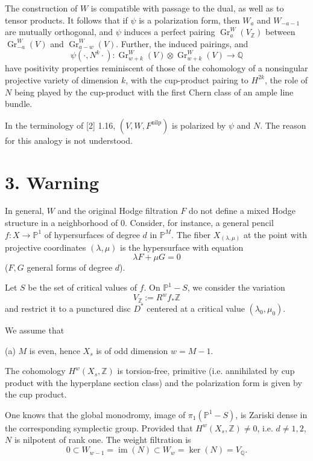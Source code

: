 \documentclass[11pt,a4paper]{article}
\theoremstyle{plain}
\theoremstyle{definition}
\DeclareMathOperator{\Gr}{Gr}
\DeclareMathOperator{\im}{im}
\begin{document}
The construction of $W$ is compatible with passage to the dual, as well as to tensor products. It follows that if $\psi$ is a polarization form, then $W_{a}$ and $W_{-a-1}$ are mutually orthogonal, and $\psi$ induces a perfect pairing $\Gr_{a}^{W}(V_{\mathbb{Z}})$ between $\Gr_{-a}^{W}(V)$ and $\Gr_{a-w}^{W}(V)$. Further, the induced pairings, and
\[
\psi(\cdot, N^{k}\cdot): \Gr_{w+k}^{W}(V) \otimes \Gr_{w+k}^{W}(V) \to \mathbb{Q}
\]
have positivity properties reminiscent of those of the cohomology of a nonsingular projective variety of dimension $k$, with the cup-product pairing to $H^{2k}$, the role of $N$ being played by the cup-product with the first Chern class of an ample line bundle.

In the terminology of [2] 1.16, $(V, W, F^{\text{nilp}})$ is polarized by $\psi$ and $N$. The reason for this analogy is not understood.

\section{3. Warning}

In general, $W$ and the original Hodge filtration $F$ do not define a mixed Hodge structure in a neighborhood of 0. Consider, for instance, a general pencil $f: X \to \mathbb{P}^{1}$ of hypersurfaces of degree $d$ in $\mathbb{P}^{M}$. The fiber $X_{(\lambda,\mu)}$ at the point with projective coordinates $(\lambda,\mu)$ is the hypersurface with equation
\[
\lambda F + \mu G = 0
\]
($F, G$ general forms of degree $d$).

Let $S$ be the set of critical values of $f$. On $\mathbb{P}^{1} - S$, we consider the variation
\[
V_{\mathbb{Z}} := R^{w}f_{*}\mathbb{Z}
\]
and restrict it to a punctured disc $D^{*}$ centered at a critical value $(\lambda_{0},\mu_{0})$.

We assume that

(a) $M$ is even, hence $X_{s}$ is of odd dimension $w = M - 1$.

The cohomology $H^{w}(X_{s}, \mathbb{Z})$ is torsion-free, primitive (i.e. annihilated by cup product with the hyperplane section class) and the polarization form is given by the cup product.

One knows that the global monodromy, image of $\pi_{1}(\mathbb{P}^{1} - S)$, is Zariski dense in the corresponding symplectic group. Provided that $H^{w}(X_{s}, \mathbb{Z}) \neq 0$, i.e. $d \neq 1, 2$, $N$ is nilpotent of rank one. The weight filtration is
\[
0 \subset W_{w-1} = \im(N) \subset W_{w} = \ker(N) = V_{\mathbb{Q}}.
\]
\end{document}
